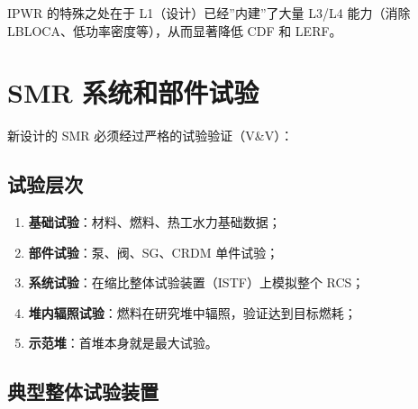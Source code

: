 \documentclass[
  UTF8,
  scheme=plain,
  fontsize=10pt,
  openany
]{ctexbook}
\begin{document}
IPWR 的特殊之处在于 L1（设计）已经''内建''了大量 L3/L4 能力（消除
LBLOCA、低功率密度等），从而显著降低 CDF 和 LERF。

\section{SMR
系统和部件试验}\label{smr-ux7cfbux7edfux548cux90e8ux4ef6ux8bd5ux9a8c}

新设计的 SMR 必须经过严格的试验验证（V\&V）：

\subsection{试验层次}\label{ux8bd5ux9a8cux5c42ux6b21}

\begin{enumerate}
\def\labelenumi{\arabic{enumi}.}
\tightlist
\item
  \textbf{基础试验}：材料、燃料、热工水力基础数据；
\item
  \textbf{部件试验}：泵、阀、SG、CRDM 单件试验；
\item
  \textbf{系统试验}：在缩比整体试验装置（ISTF）上模拟整个 RCS；
\item
  \textbf{堆内辐照试验}：燃料在研究堆中辐照，验证达到目标燃耗；
\item
  \textbf{示范堆}：首堆本身就是最大试验。
\end{enumerate}

\subsection{典型整体试验装置}\label{ux5178ux578bux6574ux4f53ux8bd5ux9a8cux88c5ux7f6e}
\end{document}
